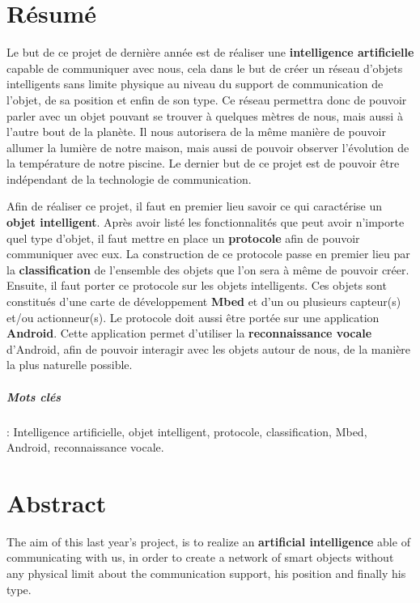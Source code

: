 ﻿
\chapter*{Résumé}
Le but de ce projet de dernière année est de réaliser une \textbf{intelligence artificielle} capable de communiquer avec nous, cela dans le but de créer un réseau d'objets intelligents sans limite physique au niveau du support de communication de l'objet, de sa position et enfin de son type. Ce réseau permettra donc de pouvoir parler avec un objet pouvant se trouver à quelques mètres de nous, mais aussi à l'autre bout de la planète. Il nous autorisera de la même manière de pouvoir allumer la lumière de notre maison, mais aussi de pouvoir observer l'évolution de la température de notre piscine. Le dernier but de ce projet est de pouvoir être indépendant de la technologie de communication.

Afin de réaliser ce projet, il faut en premier lieu savoir ce qui caractérise un \textbf{objet intelligent}. 
Après avoir listé les fonctionnalités que peut avoir n'importe quel type d'objet, il faut mettre en place un 
\textbf{protocole} afin de pouvoir communiquer avec eux. La construction de ce protocole passe en premier lieu 
par la \textbf{classification} de l'ensemble des objets que l'on sera à même de pouvoir créer. Ensuite, il 
faut porter ce protocole sur les objets intelligents. Ces objets sont constitués d'une carte de 
développement \textbf{Mbed} et d'un ou plusieurs capteur(s) et/ou actionneur(s). Le protocole doit aussi être 
portée sur une application \textbf{Android}. Cette application permet d'utiliser la \textbf{reconnaissance 
vocale} d'Android, afin de pouvoir interagir avec les objets autour de nous, de la manière la plus naturelle 
possible.
	
   \paragraph{Mots clés}: Intelligence artificielle, objet intelligent, protocole, classification, Mbed, Android, reconnaissance vocale.
   
\clearemptydoublepage
   
 \chapter*{Abstract}
The aim of this last year's project, is to realize an \textbf{artificial intelligence} able of communicating with us, in order to create a network of smart objects without any physical limit about the communication support, his position and finally his type.

